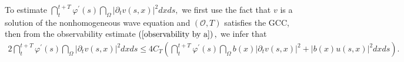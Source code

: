 \documentclass[11pt,reqno]{amsart}
\theoremstyle{plain}
\numberwithin{equation}{section}
\numberwithin{equation}{section}
\begin{document}
To estimate $\dint_{t}^{t+T}\varphi ^{\prime }\left( s\right) \dint_{\Omega
}\left\vert \partial _{t}v\left( s,x\right) \right\vert ^{2}dxds,$ we first
use the fact that $v$ is a solution of the nonhomogeneous wave equation and $%
\left( \mathcal{O},T\right) $ satisfies the GCC, then from the observability
estimate $\left( \ref{observability by a}\right) ,$ we infer that 
\begin{equation}
\begin{array}{c}
2\dint_{t}^{t+T}\varphi ^{\prime }\left( s\right) \dint_{\Omega }\left\vert
\partial _{t}v\left( s,x\right) \right\vert ^{2}dxds\leq 4C_{T}\left(
\dint_{t}^{t+T}\varphi ^{\prime }\left( s\right) \dint_{\Omega }b\left(
x\right) \left\vert \partial _{t}v\left( s,x\right) \right\vert
^{2}+\left\vert b\left( x\right) u\left( s,x\right) \right\vert
^{2}dxds\right) .%
\end{array}
\label{proof theorem estimate dtv}
\end{equation}
\end{document}
